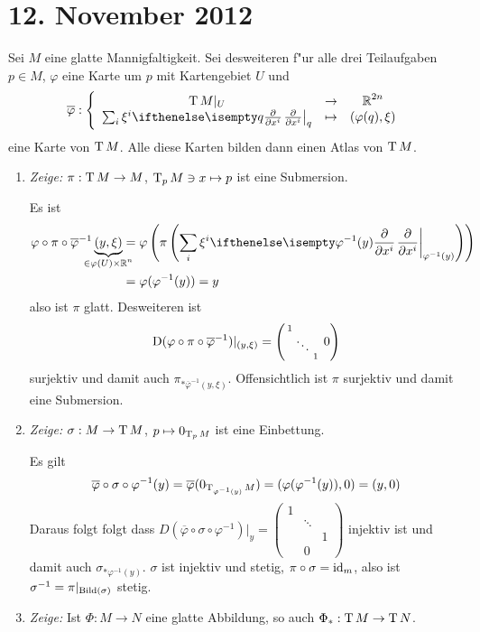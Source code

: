\section{12. November 2012}
\setcounter{Aufg}{0} %
\setcounter{Loes}{0}

\begin{Loes}
Sei $M$ eine glatte Mannigfaltigkeit. Sei desweiteren f"ur alle drei Teilaufgaben $p \in M$, $\varphi$ eine Karte um $p$ mit Kartengebiet $U$ und
	\[ \overline \varphi: \left\{ \begin{array}{ccc}  \T M|_U &\to& \R^{2n} \\
		\sum_i \xi^i\pdifffrac[q]{}{x^i} &\mapsto& (\varphi(q), \xi) \end{array} \right.\]
eine Karte von $\operatorname{T} M$. Alle diese Karten bilden dann einen Atlas von $\operatorname{T} M$.
\begin{enumerate}[label=\alph*),widest=a,leftmargin=*]
\item
	\emph{Zeige:} $\pi: \operatorname{T} M \to M$, $\operatorname{T}_p M \ni x \mapsto p$ ist eine Submersion.
	
	Es ist
	\begin{align*} \varphi \circ \pi \circ \overline \varphi^{-1} \underbrace{(y, \xi)}_{\mathclap{\in \varphi(U) \X \R^n}} &= \varphi\left(\pi\left(\sum_i \xi^i \pdifffrac[\varphi^{-1}(y)]{}{x^i}\right)\right)\\
		&= \varphi(\varphi^{-1}(y)) = y
	\end{align*}
	also ist $\pi$ glatt. Desweiteren ist
		\[ \operatorname{D}(\varphi \circ \pi \circ \overline \varphi^{-1})|_{(y, \xi)} = \left(\begin{smallmatrix}
        1 &  & \\
        & \ddots & & \\
         & & 1
      \end{smallmatrix} 0\right) \]
     surjektiv und damit auch $\pi_{*\overline\varphi^{-1}(y, \xi)}$. Offensichtlich ist $\pi$ surjektiv und damit eine Submersion.
\item
	\emph{Zeige:} $\sigma: M \to \operatorname{T} M$, $p \mapsto 0_{\operatorname{T}_pM}$ ist eine Einbettung.
	
	Es gilt
		\[\overline \varphi \circ \sigma \circ \varphi^{-1} (y) = \overline \varphi(0_{\operatorname{T}_{\varphi^{-1}(y)}M}) = (\varphi(\varphi^{-1}(y)),0) = (y,0) \]
	Daraus folgt folgt dass $D(\overline \varphi \circ \sigma \circ \varphi^{-1})|_y = \left( \begin{smallmatrix} 1 & &  \\ & \ddots & \\ & & 1 \\ & 0 & \end{smallmatrix} \right)$ injektiv ist und damit auch $\sigma_{* \varphi^{-1}(y)}$. $\sigma$ ist injektiv und stetig, $\pi \circ \sigma = \operatorname{id}_m$, also ist $\sigma^{-1} = \pi|_{\operatorname{Bild}(\sigma)}$ stetig.
\item
	\emph{Zeige:} Ist $\Phi: M \to N$ eine glatte Abbildung, so auch $\Phi_*: \operatorname{T} M \to \operatorname{T} N$.
	

\end{enumerate}
\end{Loes}

